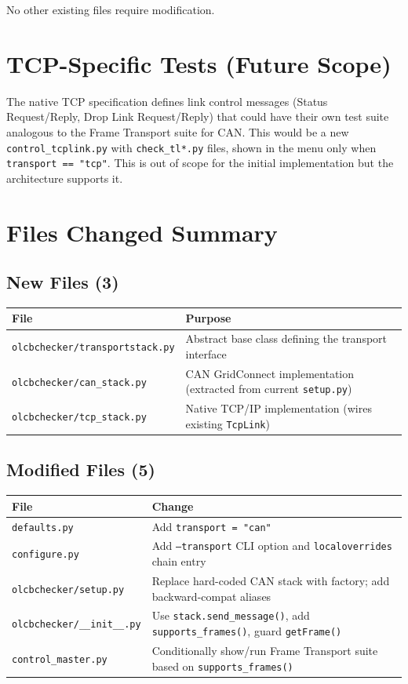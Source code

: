 No other existing files require modification.

\section{TCP-Specific Tests (Future Scope)}

The native TCP specification defines link control messages (Status
Request/Reply, Drop Link Request/Reply) that could have their own test suite
analogous to the Frame Transport suite for CAN.  This would be a new
\texttt{control\_tcplink.py} with \texttt{check\_tl*.py} files, shown in the
menu only when \texttt{transport == "tcp"}.  This is out of scope for the
initial implementation but the architecture supports it.

\section{Files Changed Summary}

\subsection{New Files (3)}

\begin{tabular}{|l|p{9cm}|}
\hline
\textbf{File} & \textbf{Purpose} \\
\hline
\texttt{olcbchecker/transportstack.py} & Abstract base class defining the transport interface \\
\hline
\texttt{olcbchecker/can\_stack.py} & CAN GridConnect implementation (extracted from current \texttt{setup.py}) \\
\hline
\texttt{olcbchecker/tcp\_stack.py} & Native TCP/IP implementation (wires existing \texttt{TcpLink}) \\
\hline
\end{tabular}

\subsection{Modified Files (5)}

\begin{tabular}{|l|p{9cm}|}
\hline
\textbf{File} & \textbf{Change} \\
\hline
\texttt{defaults.py} & Add \texttt{transport = "can"} \\
\hline
\texttt{configure.py} & Add \texttt{--transport} CLI option and \texttt{localoverrides} chain entry \\
\hline
\texttt{olcbchecker/setup.py} & Replace hard-coded CAN stack with factory; add backward-compat aliases \\
\hline
\texttt{olcbchecker/\_\_init\_\_.py} & Use \texttt{stack.send\_message()}, add \texttt{supports\_frames()}, guard \texttt{getFrame()} \\
\hline
\texttt{control\_master.py} & Conditionally show/run Frame Transport suite based on \texttt{supports\_frames()} \\
\hline
\end{tabular}

